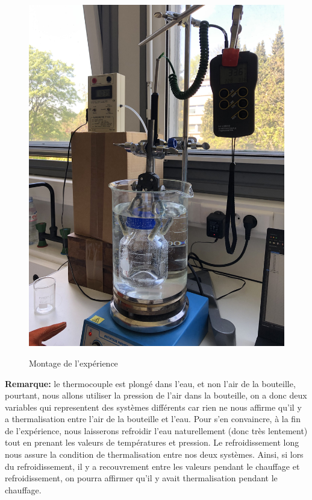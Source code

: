 \documentclass[12pt]{article}
\begin{document}
\begin{figure}[!h]
	\begin{center}
		\includegraphics[scale=0.07]{img/exp2.jpg}
		\label{Exp2}
		\caption{Montage de l'expérience}
	\end{center}
\end{figure}

\newpage
\textbf{Remarque:} le thermocouple est plongé dans l'eau, et non l'air de la bouteille, pourtant, nous allons utiliser la pression de l'air dans
la bouteille, on a donc deux variables qui representent des systèmes différents car rien ne nous affirme qu'il y a thermalisation entre l'air de la bouteille et l'eau.
Pour s'en convaincre, à la fin de l'expérience, nous laisserons refroidir l'eau naturellement (donc très lentement) tout en prenant les valeurs de températures et pression. 
Le refroidissement long nous assure la condition de thermalisation entre nos deux systèmes. Ainsi, si lors du refroidissement, il y a recouvrement entre les valeurs pendant le chauffage et 
refroidissement, on pourra affirmer qu'il y avait thermalisation pendant le chauffage.
\end{document}
